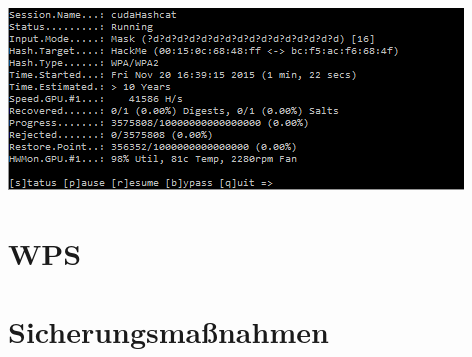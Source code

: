\includegraphics[width=\textwidth]{bilder/wlan/cudaHashcatNUMSeriesCrack.png}\\



\section{WPS}

\section{Sicherungsmaßnahmen}


